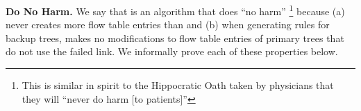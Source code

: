 



{\bf Do No Harm.} 
We say that \merge is an algorithm that does ``no harm''  \footnote{This is similar in spirit to the Hippocratic Oath taken by physicians that they will ``never do harm [to patients]'' }
because (a) \merge never creates more flow table entries than \base and (b) when generating rules for backup trees, \merge makes no modifications to flow table entries of primary trees that do not use the 
failed link. We informally prove each of these properties below.

